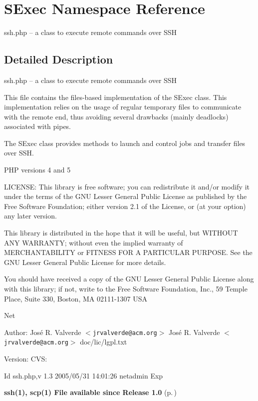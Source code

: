 \section{SExec Namespace Reference}
\label{namespaceSExec}
ssh.php -- a class to execute remote commands over SSH  




\subsection{Detailed Description}
ssh.php -- a class to execute remote commands over SSH 

This file contains the files-based implementation of the SExec class. This implementation relies on the usage of regular temporary files to communicate with the remote end, thus avoiding several drawbacks (mainly deadlocks) associated with pipes.

The SExec class provides methods to launch and control jobs and transfer files over SSH.

PHP versions 4 and 5

LICENSE: This library is free software; you can redistribute it and/or modify it under the terms of the GNU Lesser General Public License as published by the Free Software Foundation; either version 2.1 of the License, or (at your option) any later version.

This library is distributed in the hope that it will be useful, but WITHOUT ANY WARRANTY; without even the implied warranty of MERCHANTABILITY or FITNESS FOR A PARTICULAR PURPOSE. See the GNU Lesser General Public License for more details.

You should have received a copy of the GNU Lesser General Public License along with this library; if not, write to the Free Software Foundation, Inc., 59 Temple Place, Suite 330, Boston, MA 02111-1307 USA

Net \begin{Desc}
\item[Author:]Jos\'{e} R. Valverde $<${\tt jrvalverde@acm.org}$>$  Jos\'{e} R. Valverde $<${\tt jrvalverde@acm.org}$>$  doc/lic/lgpl.txt \end{Desc}
\begin{Desc}
\item[Version:]CVS: \begin{Desc}
\item[Id]ssh.php,v 1.3 2005/05/31 14:01:26 netadmin Exp \end{Desc}
{\bf ssh(1), scp(1)  File available since Release 1.0 }{\rm (p.\,\pageref{})}\end{Desc}


